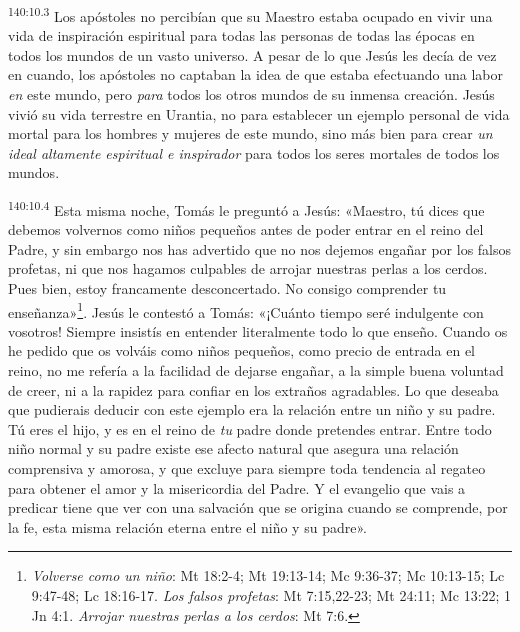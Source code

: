 \par
\textsuperscript{140:10.3} Los apóstoles no percibían que su Maestro estaba ocupado en vivir una vida de inspiración espiritual para todas las personas de todas las épocas en todos los mundos de un vasto universo. A pesar de lo que Jesús les decía de vez en cuando, los apóstoles no captaban la idea de que estaba efectuando una labor \textit{en} este mundo, pero \textit{para} todos los otros mundos de su inmensa creación. Jesús vivió su vida terrestre en Urantia, no para establecer un ejemplo personal de vida mortal para los hombres y mujeres de este mundo, sino más bien para crear \textit{un ideal altamente espiritual e inspirador} para todos los seres mortales de todos los mundos.

\par
\textsuperscript{140:10.4} Esta misma noche, Tomás le preguntó a Jesús: «Maestro, tú dices que debemos volvernos como niños pequeños antes de poder entrar en el reino del Padre, y sin embargo nos has advertido que no nos dejemos engañar por los falsos profetas, ni que nos hagamos culpables de arrojar nuestras perlas a los cerdos. Pues bien, estoy francamente desconcertado. No consigo comprender tu enseñanza»\footnote{\textit{Volverse como un niño}: Mt 18:2-4; Mt 19:13-14; Mc 9:36-37; Mc 10:13-15; Lc 9:47-48; Lc 18:16-17. \textit{Los falsos profetas}: Mt 7:15,22-23; Mt 24:11; Mc 13:22; 1 Jn 4:1. \textit{Arrojar nuestras perlas a los cerdos}: Mt 7:6.}. Jesús le contestó a Tomás: «¡Cuánto tiempo seré indulgente con vosotros! Siempre insistís en entender literalmente todo lo que enseño. Cuando os he pedido que os volváis como niños pequeños, como precio de entrada en el reino, no me refería a la facilidad de dejarse engañar, a la simple buena voluntad de creer, ni a la rapidez para confiar en los extraños agradables. Lo que deseaba que pudierais deducir con este ejemplo era la relación entre un niño y su padre. Tú eres el hijo, y es en el reino de \textit{tu} padre donde pretendes entrar. Entre todo niño normal y su padre existe ese afecto natural que asegura una relación comprensiva y amorosa, y que excluye para siempre toda tendencia al regateo para obtener el amor y la misericordia del Padre. Y el evangelio que vais a predicar tiene que ver con una salvación que se origina cuando se comprende, por la fe, esta misma relación eterna entre el niño y su padre».

